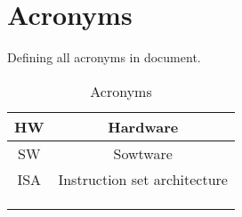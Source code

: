 \documentclass{scrreprt}
\begin{document}
    
    
\section*{Acronyms}
    Defining all acronyms in document. 
    \begin{table}[ht]
        \centering
        \begin{tabular}{|c|c|} \hline 
            HW & Hardware\\ \hline 
            SW & Sowtware\\ \hline 
            ISA & Instruction set architecture\\ \hline 
             & \\ \hline 
             & \\ \hline 
             & \\ \hline
        \end{tabular}
        \caption{Acronyms}
        \label{tab:table4}
    \end{table}
\end{document}
